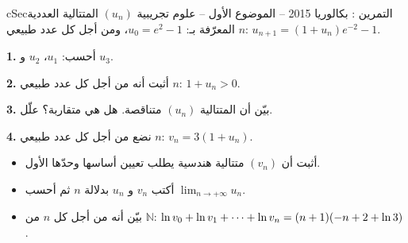 \documentclass[12pt,a4paper]{article}
\newenvironment{BOX}[2]{\begin{otherlanguage}{english}\begin{arbox}{#1}{#2}}{\end{arbox}\end{otherlanguage}}
\newcounter{exo}
\newenvironment{tamrin}[1]{\stepcounter{exo}\begin{BOX}{cSec}{التمرين \theexo: #1}}{\end{BOX}}
\renewcommand{\cdots}{\mathinner{\cdotp\cdotp\cdotp}}
\newcommand{\N}{\mathbb{N}}
\newcommand{\limn}{\displaystyle\lim_{n\to+\infty}}
\newenvironment{sq}{\begin{itemize}[leftmargin=2.4em,itemsep=3pt]}{\end{itemize}}
\newcommand{\qa}{\item[(أ)]}\newcommand{\qb}{\item[(ب)]}\newcommand{\qc}{\item[(جـ)]}\newcommand{\qd}{\item[(د)]}\newcommand{\qe}{\item[(هـ)]}
\newcommand{\QQ}[1]{\par\smallskip\textbf{#1.} }
\begin{document}
\begin{tamrin}{بكالوريا 2015 -- الموضوع الأول -- علوم تجريبية}
$(u_n)$ المتتالية العددية المعرّفة بـ: $u_0=e^2-1$، ومن أجل كل عدد طبيعي $n$: $u_{n+1}=(1+u_n)e^{-2}-1$.
\QQ{1} أحسب: $u_1$، $u_2$ و $u_3$.
\QQ{2} أثبت أنه من أجل كل عدد طبيعي $n$: $1+u_n>0$.
\QQ{3} بيّن أن المتتالية $(u_n)$ متناقصة. هل هي متقاربة؟ علّل.
\QQ{4} نضع من أجل كل عدد طبيعي $n$: $v_n=3(1+u_n)$.
\begin{sq}
\qa أثبت أن $(v_n)$ متتالية هندسية يطلب تعيين أساسها وحدّها الأول.
\qb أكتب $v_n$ و $u_n$ بدلالة $n$ ثم أحسب $\limn u_n$.
\qc بيّن أنه من أجل كل $n$ من $\N$: $\ln v_0+\ln v_1+\cdots+\ln v_n=(n+1)(-n+2+\ln 3)$.
\end{sq}
\end{tamrin}
\end{document}
